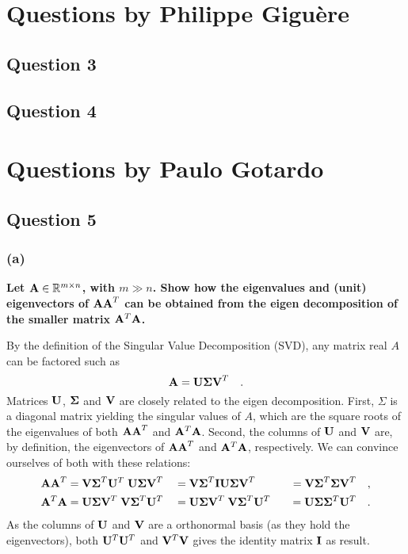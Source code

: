 \documentclass{report}
\begin{document}
\chapter{Questions by Philippe Giguère}

\section{Question 3}

\section{Question 4}

\chapter{Questions by Paulo Gotardo}

\section{Question 5}
\subsection{(a)}
\textbf{Let $\mathbf{A} \in \mathbb{R}^{m \times n}$, with $m \gg n$. Show how the eigenvalues and (unit) eigenvectors of $\mathbf{AA}^T$ can be obtained from the eigen decomposition of the smaller matrix $\mathbf{A}^T\mathbf{A}$.}

By the definition of the Singular Value Decomposition (SVD), any matrix real $A$ can be factored such as
\begin{equation}
\mathbf{A} = \mathbf{U \Sigma V}^T \quad.
\end{equation}
Matrices $\mathbf{U}$, $\mathbf{\Sigma}$ and $\mathbf{V}$ are closely related to the eigen decomposition. First, $\Sigma$ is a diagonal matrix yielding the singular values of $A$, which are the square roots of the eigenvalues of both $\mathbf{AA}^T$ and $\mathbf{A}^T\mathbf{A}$. Second, the columns of $\mathbf{U}$ and $\mathbf{V}$ are, by definition, the eigenvectors of $\mathbf{AA}^T$ and $\mathbf{A}^T\mathbf{A}$, respectively. We can convince ourselves of both with these relations:
\begin{align*}
\mathbf{AA}^T           &= \mathbf{V\Sigma}^T\mathbf{U}^T \; \mathbf{U\Sigma V}^T
                        &&= \mathbf{V\Sigma}^T\mathbf{IU\Sigma V}^T 
                        &&&= \mathbf{V\Sigma}^T\mathbf{\Sigma V}^T \quad,\\
\mathbf{A}^T\mathbf{A}  &= \mathbf{U\Sigma V}^T \; \mathbf{V\Sigma}^T\mathbf{U}^T
                        &&= \mathbf{U\Sigma V}^T \; \mathbf{V\Sigma}^T\mathbf{U}^T
                        &&&= \mathbf{U\Sigma}\mathbf{\Sigma}^T\mathbf{U}^T \quad.
\end{align*}
As the columns of $\mathbf{U}$ and $\mathbf{V}$ are a orthonormal basis (as they hold the eigenvectors), both $\mathbf{U}^T\mathbf{U}^T$ and $\mathbf{V}^T\mathbf{V}$ gives the identity matrix $\mathbf{I}$ as result.
\end{document}
